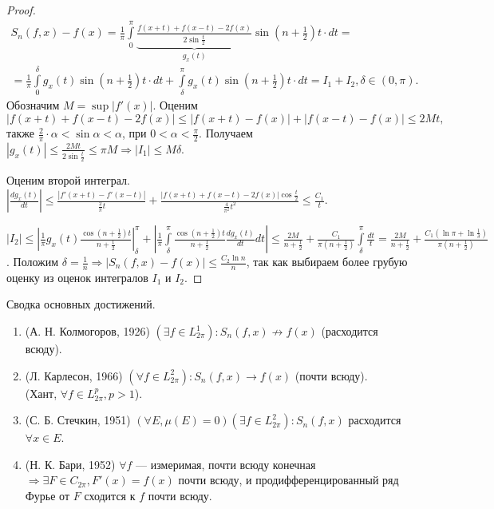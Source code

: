 \begin{proof}
	\begin{multline*}
		S_n(f,x)-f(x)=\frac{1}{\pi}\int\limits_{0}^\pi\underbrace{\frac{f(x+t)+f(x-t)-2f(x)}{2\sin \frac{t}{2}}}_{g_x(t)}\sin \left(n+\frac{1}{2}\right)t\cdot dt =
		 \\ =\frac{1}{\pi}\int\limits_0^\delta g_x(t)\sin\left(n+\frac{1}{2}\right)t\cdot dt+\int\limits_\delta^\pi g_x(t)\sin\left(n+\frac{1}{2}\right)t\cdot dt=I_1+I_2, \delta\in(0,\pi).
	\end{multline*}
Обозначим $M=\sup |f'(x)|$. Оценим $$|f(x+t)+f(x-t)-2f(x)|\leqslant |f(x+t)-f(x)|+|f(x-t)-f(x)|\leqslant 2Mt, $$ также $\frac{2}{\pi}\cdot\alpha<\sin \alpha<\alpha$, при $ 0<\alpha<\frac{\pi}{2}$. Получаем	$|g_x(t)|\leqslant\frac{2Mt}{2\sin\frac{t}{2}}\leqslant \pi M\Rightarrow |I_1|\leqslant M\delta$.

Оценим второй интеграл. $\left|\frac{dg_x(t)}{dt}\right|\leqslant \frac{|f'(x+t)-f'(x-t)|}{\frac{2}{\pi}t}+\frac{|f(x+t)+f(x-t)-2f(x)|\cos\frac{t}{2}}{\frac{4}{\pi^2}t^2}\leqslant\frac{C_1}{t}$.

$|I_2|\leqslant\left|\frac{1}{\pi} g_x(t)\frac{\cos(n+\frac{1}{2})t}{n+\frac{1}{2}}\right|_\delta^\pi+\left|\frac{1}{\pi}\int\limits_\delta^\pi\frac{\cos(n+\frac{1}{2})t}{n+\frac{1}{2}}\frac{dg_x(t)}{dt}dt\right|\leqslant \frac{2M}{n+\frac{1}{2}}+\frac{C_1}{\pi(n+\frac{1}{2})}\int\limits_\delta^\pi\frac{dt}{t}=\frac{2M}{n+\frac{1}{2}}+\frac{C_1(\ln\pi+\ln\frac{1}{\delta})}{\pi(n+\frac{1}{2})}$. Положим $\delta = \frac{1}{n}\Rightarrow |S_n(f,x)-f(x)|\leqslant\frac{C_2\ln n}{n}$, так как выбираем более грубую оценку из оценок интегралов $I_1$ и $I_2$.
\end{proof}

Сводка основных достижений.
\begin{enumerate}
	\item (А. Н. Колмогоров, 1926) $(\exists f\in L_{2\pi}^1): S_n(f,x)\not\to f(x)$ (расходится всюду).
	\item (Л. Карлесон, 1966) $(\forall f\in L_{2\pi}^2): S_n(f,x)\to f(x)$ (почти всюду). \\(Хант, $\forall f\in L_{2\pi}^p, p>1$).
	\item (С. Б. Стечкин, 1951) $(\forall E, \mu(E)=0)(\exists f\in L_{2\pi}^2): S_n(f,x)$ расходится $\forall x\in E$. 
	\item (Н. К. Бари, 1952) $\forall f$ --- измеримая, почти всюду конечная $\Rightarrow\exists F\in C_{2\pi}, F'(x)=f(x)$ почти всюду, и продифференцированный ряд Фурье от $F$ сходится к $f$ почти всюду.
\end{enumerate}

